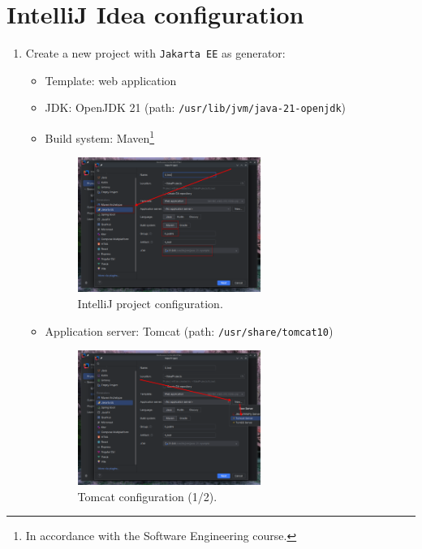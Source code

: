 \section{IntelliJ Idea configuration}

\begin{enumerate}
  \item Create a new project with \texttt{Jakarta EE} as generator:
    \begin{itemize}
      \item Template: web application
      \item JDK: OpenJDK 21 (path: \texttt{/usr/lib/jvm/java-21-openjdk})
      \item Build system: Maven\footnote{In accordance with the Software Engineering course.}
        \begin{figure}[H]
          \centering
          \includegraphics[width=0.6\textwidth]{img/intellij/intellij_2.png}
          \caption{IntelliJ project configuration.}
        \end{figure}

      \item Application server: Tomcat (path: \texttt{/usr/share/tomcat10})
        \begin{figure}[H]
          \centering
          \includegraphics[width=0.6\textwidth]{img/intellij/intellij_3.png}
          \caption{Tomcat configuration (1/2).}
        \end{figure}


\end{itemize}
\end{enumerate}
